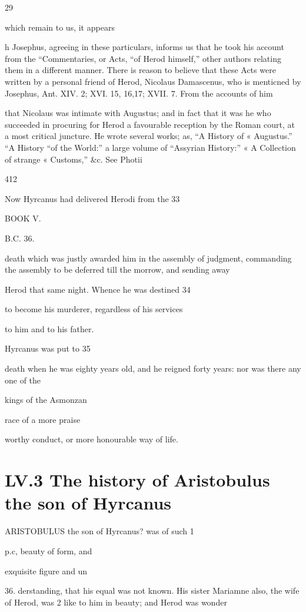 29 

which remain to us, it appears 

h Josephus, agreeing in these particulars, informs us that he took his account from the “Commentaries, or Acts, “of Herod himself,” other authors relating them in a different manner. There is reason to believe that these Acts were written by a personal friend of Herod, Nicolaus Damascenus, who is menticned by Josephus, Ant. XIV. 2; XVI. 15, 16,17; XVII. 7. From the accounts of him 

that Nicolaus was intimate with Augustus; and in fact that it was he who succeeded in procuring for Herod a favourable reception by the Roman court, at a most critical juncture. He wrote several works; as, “A History of « Augustus.” “A History “of the World:” a large volume of “Assyrian History:” « A Collection of strange « Customs,” &c. See Photii 

412 

Now Hyrcanus had delivered Herodi from the 33 

BOOK V. 

B.C. 36. 

death which was justly awarded him in the assembly of judgment, commanding the assembly to be deferred till the morrow, and sending away 

Herod that same night. Whence he was destined 34 

to become his murderer, regardless of his services 

to him and to his father. 

Hyrcanus was put to 35 

death when he was eighty years old, and he reigned forty years: nor was there any one of the 

kings of the Asmonzan 

race of a more praise

worthy conduct, or more honourable way of life. 

\chapter{LV.3 The history of Aristobulus the son of Hyrcanus}

ARISTOBULUS the son of Hyrcanus? was of such 1 

p.c, beauty of form, and 

exquisite figure and un

36. derstanding, that his equal was not known. His sister Mariamne also, the wife of Herod, was 2 like to him in beauty; and Herod was wonder

